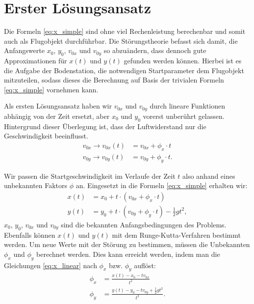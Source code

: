 \section{Erster Lösungsansatz
\label{perturbation:section:ersterloesungsansatz}}

Die Formeln \eqref{eq:x_simple} sind ohne viel Rechenleistung berechenbar und somit auch als Flugobjekt durchführbar.
Die Störungstheorie befasst sich damit, die Anfangswerte $x_0$, $y_0$, $v_{0x}$ und $v_{0y}$ so abzuändern,
dass dennoch gute Approximationen für $x(t)$ und $y(t)$ gefunden werden können.
Hierbei ist es die Aufgabe der Bodenstation, die notwendigen Startparameter dem Flugobjekt mitzuteilen,
sodass dieses die Berechnung auf Basis der trivialen Formeln \ref{eq:x_simple}  vornehmen kann.

Als ersten Lösungsansatz haben wir $v_{0x}$ und $v_{0y}$ durch lineare Funktionen abhängig von der Zeit ersetzt, aber $x_0$ und $y_0$ vorerst unberührt gelassen.
Hintergrund dieser Überlegung ist, dass der Luftwiderstand nur die Geschwindigkeit beeinflusst.
\begin{equation*}
	\begin{aligned}
		v_{0x} \rightarrow v_{0x}(t) &= v_{0x} + \phi_x \cdot t\\
		v_{0y} \rightarrow v_{0y}(t) &= v_{0y} + \phi_y \cdot t.
	\end{aligned}
\end{equation*}



Wir passen die Startgeschwindigkeit im Verlaufe der Zeit $t$ also anhand eines unbekannten Faktors $\phi$ an.
Eingesetzt in die Formeln \eqref{eq:x_simple} erhalten wir:
\begin{equation}\label{eq:x_linear}
\begin{aligned}
    x(t) &= x_0 + t \cdot (v_{0x} + \phi_x \cdot t) \\
    y(t) &= y_0 + t \cdot (v_{0y} + \phi_y \cdot t) - \frac{1}{2}gt^2,
\end{aligned}
\end{equation}
$x_0$, $y_0$, $v_{0x}$ und $v_{0y}$ sind die bekannten Anfangsbedingungen des Problems.
Ebenfalls können $x(t)$ und $y(t)$ mit dem Runge-Kutta-Verfahren bestimmt werden.
Um neue Werte mit der Störung zu bestimmen, müssen die Unbekannten $\phi_x$ und $\phi_y$ berechnet werden.
Dies kann erreicht werden, indem man die Gleichungen \eqref{eq:x_linear} nach $\phi_x$ bzw. $\phi_y$ auflöst:
\begin{equation}
	\begin{aligned}
	\phi_x &= \frac{x(t) - x_0 - tv_{0x}}{t^2}\\
	\phi_y &= \frac{y(t) - y_0 - tv_{0y} + \frac{1}{2}gt^2}{t^2}.
	\end{aligned}
\end{equation}

